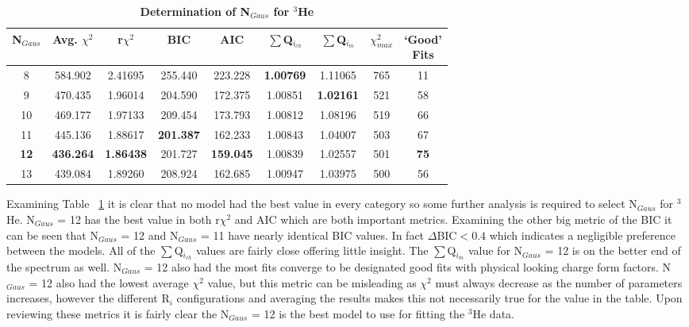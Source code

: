 \begin{table}[!h]
\centering
\begin{tabular}{|c c c c c c c c c|}
\hline
\textbf{N$_{Gaus}$} & \textbf{Avg. $\chi^2$} & \textbf{r$\chi^2$} & \textbf{BIC} & \textbf{AIC} & \textbf{$\sum$Q$_{i_{ch}}$} & \textbf{$\sum$Q$_{i_{m}}$} & \textbf{$\chi^2_{max}$} & \makecell{\textbf{`Good'}\\ \textbf{Fits}} \\
\hline
8 & 584.902 & 2.41695 & 255.440 & 223.228 & \textbf{1.00769} & 1.11065 & 765 & 11 \\
9 & 470.435 & 1.96014 & 204.590 & 172.375 & 1.00851 & \textbf{1.02161} & 521 & 58 \\
10 & 469.177 & 1.97133 & 209.454 & 173.793 & 1.00812 & 1.08196 & 519 & 66 \\
11 & 445.136 & 1.88617 & \textbf{201.387} & 162.233 & 1.00843 & 1.04007 & 503 & 67 \\
\textbf{12} & \textbf{436.264} & \textbf{1.86438} & 201.727 & \textbf{159.045} & 1.00839 & 1.02557 & 501 & \textbf{75} \\
13 & 439.084 & 1.89260 & 208.924 & 162.685 & 1.00947 & 1.03975 & 500 & 56 \\
\hline
\end{tabular}
\caption{\bf{Determination of N$_{Gaus}$ for $^3$He}}
\label{tab:3he_ngaus}
\end{table}

Examining Table ~\ref{tab:3he_ngaus} it is clear that no model had the best value in every category so some further analysis is required to select N$_{Gaus}$ for $^3$He. N$_{Gaus}$ = 12 has the best value in both r$\chi^2$ and AIC which are both important metrics. Examining the other big metric of the BIC it can be seen that N$_{Gaus}$ = 12 and N$_{Gaus}$ = 11 have nearly identical BIC values. In fact $\Delta$BIC$<0.4$ which indicates a negligible preference between the models. All of the $\sum$Q$_{i_{ch}}$ values are fairly close offering little insight. The $\sum$Q$_{i_{m}}$ value for N$_{Gaus}$ = 12 is on the better end of the spectrum as well. N$_{Gaus}$ = 12 also had the most fits converge to be designated good fits with physical looking charge form factors. N$_{Gaus}$ = 12 also had the lowest average $\chi^2$ value, but this metric can be misleading as $\chi^2$ must always decrease as the number of parameters increases, however the different R$_i$ configurations and averaging the results makes this not necessarily true for the value in the table. Upon reviewing these metrics it is fairly clear the N$_{Gaus}$ = 12 is the best model to use for fitting the $^3$He data.

